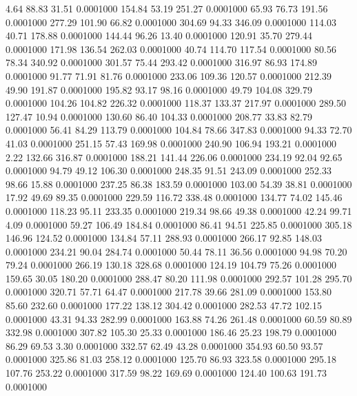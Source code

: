   4.64   88.83   31.51   0.0001000
 154.84   53.19  251.27   0.0001000
  65.93   76.73  191.56   0.0001000
 277.29  101.90   66.82   0.0001000
 304.69   94.33  346.09   0.0001000
 114.03   40.71  178.88   0.0001000
 144.44   96.26   13.40   0.0001000
 120.91   35.70  279.44   0.0001000
 171.98  136.54  262.03   0.0001000
  40.74  114.70  117.54   0.0001000
  80.56   78.34  340.92   0.0001000
 301.57   75.44  293.42   0.0001000
 316.97   86.93  174.89   0.0001000
  91.77   71.91   81.76   0.0001000
 233.06  109.36  120.57   0.0001000
 212.39   49.90  191.87   0.0001000
 195.82   93.17   98.16   0.0001000
  49.79  104.08  329.79   0.0001000
 104.26  104.82  226.32   0.0001000
 118.37  133.37  217.97   0.0001000
 289.50  127.47   10.94   0.0001000
 130.60   86.40  104.33   0.0001000
 208.77   33.83   82.79   0.0001000
  56.41   84.29  113.79   0.0001000
 104.84   78.66  347.83   0.0001000
  94.33   72.70   41.03   0.0001000
 251.15   57.43  169.98   0.0001000
 240.90  106.94  193.21   0.0001000
   2.22  132.66  316.87   0.0001000
 188.21  141.44  226.06   0.0001000
 234.19   92.04   92.65   0.0001000
  94.79   49.12  106.30   0.0001000
 248.35   91.51  243.09   0.0001000
 252.33   98.66   15.88   0.0001000
 237.25   86.38  183.59   0.0001000
 103.00   54.39   38.81   0.0001000
  17.92   49.69   89.35   0.0001000
 229.59  116.72  338.48   0.0001000
 134.77   74.02  145.46   0.0001000
 118.23   95.11  233.35   0.0001000
 219.34   98.66   49.38   0.0001000
  42.24   99.71    4.09   0.0001000
  59.27  106.49  184.84   0.0001000
  86.41   94.51  225.85   0.0001000
 305.18  146.96  124.52   0.0001000
 134.84   57.11  288.93   0.0001000
 266.17   92.85  148.03   0.0001000
 234.21   90.04  284.74   0.0001000
  50.44   78.11   36.56   0.0001000
  94.98   70.20   79.24   0.0001000
 266.19  130.18  328.68   0.0001000
 124.19  104.79   75.26   0.0001000
 159.65   30.05  180.20   0.0001000
 288.47   80.20  111.98   0.0001000
 292.57  101.28  295.70   0.0001000
 320.71   57.71   64.47   0.0001000
 217.78   39.66  281.09   0.0001000
 153.80   85.60  232.60   0.0001000
 177.22  138.12  304.42   0.0001000
 282.53   47.72  102.15   0.0001000
  43.31   94.33  282.99   0.0001000
 163.88   74.26  261.48   0.0001000
  60.59   80.89  332.98   0.0001000
 307.82  105.30   25.33   0.0001000
 186.46   25.23  198.79   0.0001000
  86.29   69.53    3.30   0.0001000
 332.57   62.49   43.28   0.0001000
 354.93   60.50   93.57   0.0001000
 325.86   81.03  258.12   0.0001000
 125.70   86.93  323.58   0.0001000
 295.18  107.76  253.22   0.0001000
 317.59   98.22  169.69   0.0001000
 124.40  100.63  191.73   0.0001000
